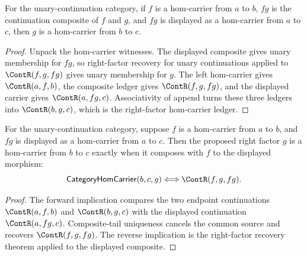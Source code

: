 \begin{theorem}
\label{thm:category-hom-carrier-comp-right-factor}
For the unary-continuation category, if \(f\) is a hom-carrier from \(a\) to
\(b\), \(fg\) is the continuation composite of \(f\) and \(g\), and \(fg\) is
displayed as a hom-carrier from \(a\) to \(c\), then \(g\) is a hom-carrier
from \(b\) to \(c\).
\end{theorem}
\begin{proof}
Unpack the hom-carrier witnesses. The displayed composite gives unary
membership for \(fg\), so right-factor recovery for unary continuations applied
to \(\ContR(f,g,fg)\) gives unary membership for \(g\). The left hom-carrier
gives \(\ContR(a,f,b)\), the composite ledger gives \(\ContR(f,g,fg)\), and
the displayed carrier gives \(\ContR(a,fg,c)\). Associativity of append turns
these three ledgers into \(\ContR(b,g,c)\), which is the right-factor
hom-carrier ledger.
\end{proof}

\begin{theorem}
\label{thm:category-hom-carrier-comp-right-factor-iff}
For the unary-continuation category, suppose \(f\) is a hom-carrier from \(a\)
to \(b\), and \(fg\) is displayed as a hom-carrier from \(a\) to \(c\). Then
the proposed right factor \(g\) is a hom-carrier from \(b\) to \(c\) exactly
when it composes with \(f\) to the displayed morphism:
$$
\mathsf{CategoryHomCarrier}(b,c,g)
\Longleftrightarrow
\ContR(f,g,fg).
$$
\end{theorem}
\begin{proof}
The forward implication compares the two endpoint continuations
\(\ContR(a,f,b)\) and \(\ContR(b,g,c)\) with the displayed continuation
\(\ContR(a,fg,c)\). Composite-tail uniqueness cancels the common source and
recovers \(\ContR(f,g,fg)\). The reverse implication is the right-factor
recovery theorem applied to the displayed composite.
\end{proof}

